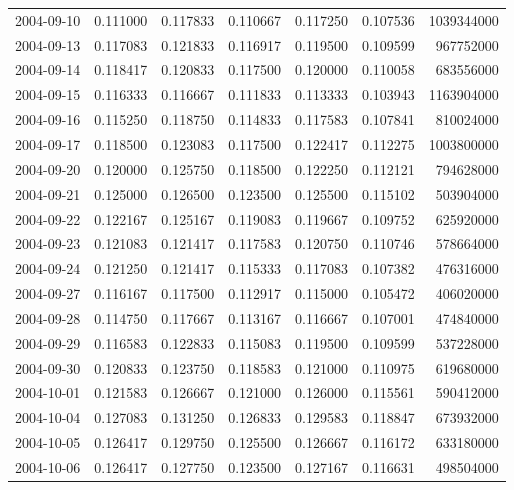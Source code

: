 \begin{tabular}{lrrrrrr}
2004-09-10 &    0.111000 &    0.117833 &    0.110667 &    0.117250 &    0.107536 &  1039344000 \\
2004-09-13 &    0.117083 &    0.121833 &    0.116917 &    0.119500 &    0.109599 &   967752000 \\
2004-09-14 &    0.118417 &    0.120833 &    0.117500 &    0.120000 &    0.110058 &   683556000 \\
2004-09-15 &    0.116333 &    0.116667 &    0.111833 &    0.113333 &    0.103943 &  1163904000 \\
2004-09-16 &    0.115250 &    0.118750 &    0.114833 &    0.117583 &    0.107841 &   810024000 \\
2004-09-17 &    0.118500 &    0.123083 &    0.117500 &    0.122417 &    0.112275 &  1003800000 \\
2004-09-20 &    0.120000 &    0.125750 &    0.118500 &    0.122250 &    0.112121 &   794628000 \\
2004-09-21 &    0.125000 &    0.126500 &    0.123500 &    0.125500 &    0.115102 &   503904000 \\
2004-09-22 &    0.122167 &    0.125167 &    0.119083 &    0.119667 &    0.109752 &   625920000 \\
2004-09-23 &    0.121083 &    0.121417 &    0.117583 &    0.120750 &    0.110746 &   578664000 \\
2004-09-24 &    0.121250 &    0.121417 &    0.115333 &    0.117083 &    0.107382 &   476316000 \\
2004-09-27 &    0.116167 &    0.117500 &    0.112917 &    0.115000 &    0.105472 &   406020000 \\
2004-09-28 &    0.114750 &    0.117667 &    0.113167 &    0.116667 &    0.107001 &   474840000 \\
2004-09-29 &    0.116583 &    0.122833 &    0.115083 &    0.119500 &    0.109599 &   537228000 \\
2004-09-30 &    0.120833 &    0.123750 &    0.118583 &    0.121000 &    0.110975 &   619680000 \\
2004-10-01 &    0.121583 &    0.126667 &    0.121000 &    0.126000 &    0.115561 &   590412000 \\
2004-10-04 &    0.127083 &    0.131250 &    0.126833 &    0.129583 &    0.118847 &   673932000 \\
2004-10-05 &    0.126417 &    0.129750 &    0.125500 &    0.126667 &    0.116172 &   633180000 \\
2004-10-06 &    0.126417 &    0.127750 &    0.123500 &    0.127167 &    0.116631 &   498504000 \\

\end{tabular}
